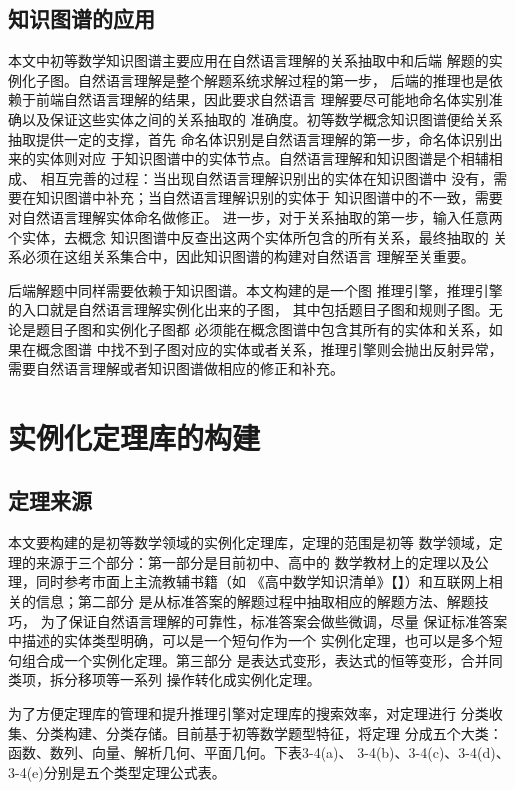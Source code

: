 \documentclass{standalone}
\begin{document}
\subsection{知识图谱的应用}
本文中初等数学知识图谱主要应用在自然语言理解的关系抽取中和后端
解题的实例化子图。自然语言理解是整个解题系统求解过程的第一步，
后端的推理也是依赖于前端自然语言理解的结果，因此要求自然语言
理解要尽可能地命名体实别准确以及保证这些实体之间的关系抽取的
准确度。初等数学概念知识图谱便给关系抽取提供一定的支撑，首先
命名体识别是自然语言理解的第一步，命名体识别出来的实体则对应
于知识图谱中的实体节点。自然语言理解和知识图谱是个相辅相成、
相互完善的过程：当出现自然语言理解识别出的实体在知识图谱中
没有，需要在知识图谱中补充；当自然语言理解识别的实体于
知识图谱中的不一致，需要对自然语言理解实体命名做修正。
进一步，对于关系抽取的第一步，输入任意两个实体，去概念
知识图谱中反查出这两个实体所包含的所有关系，最终抽取的
关系必须在这组关系集合中，因此知识图谱的构建对自然语言
理解至关重要。

后端解题中同样需要依赖于知识图谱。本文构建的是一个图
推理引擎，推理引擎的入口就是自然语言理解实例化出来的子图，
其中包括题目子图和规则子图。无论是题目子图和实例化子图都
必须能在概念图谱中包含其所有的实体和关系，如果在概念图谱
中找不到子图对应的实体或者关系，推理引擎则会抛出反射异常，
需要自然语言理解或者知识图谱做相应的修正和补充。

\section{实例化定理库的构建}
\subsection{定理来源}
本文要构建的是初等数学领域的实例化定理库，定理的范围是初等
数学领域，定理的来源于三个部分：第一部分是目前初中、高中的
数学教材上的定理以及公理，同时参考市面上主流教辅书籍（如
《高中数学知识清单》【】）和互联网上相关的信息；第二部分
是从标准答案的解题过程中抽取相应的解题方法、解题技巧，
为了保证自然语言理解的可靠性，标准答案会做些微调，尽量
保证标准答案中描述的实体类型明确，可以是一个短句作为一个
实例化定理，也可以是多个短句组合成一个实例化定理。第三部分
是表达式变形，表达式的恒等变形，合并同类项，拆分移项等一系列
操作转化成实例化定理。

为了方便定理库的管理和提升推理引擎对定理库的搜索效率，对定理进行
分类收集、分类构建、分类存储。目前基于初等数学题型特征，将定理
分成五个大类：函数、数列、向量、解析几何、平面几何。下表3-4(a)、
3-4(b)、3-4(c)、3-4(d)、3-4(e)分别是五个类型定理公式表。
\end{document}
